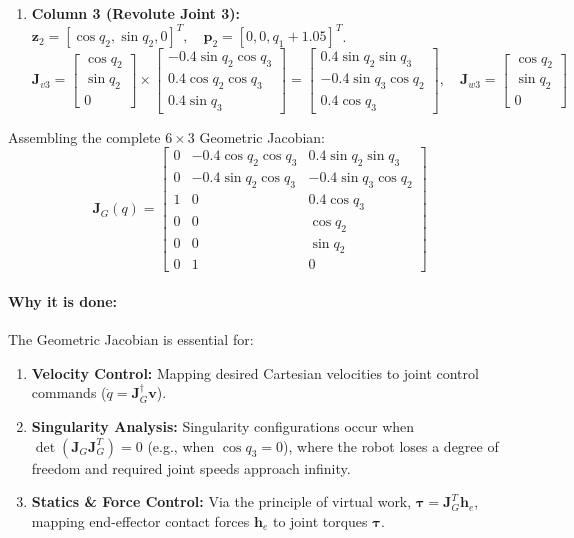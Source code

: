 \documentclass[11pt, a4paper]{article}
\begin{document}
\begin{enumerate}[leftmargin=1.5em]
    \item \textbf{Column 3 (Revolute Joint 3):}
    $\mathbf{z}_2 = [\cos q_2, \sin q_2, 0]^T, \quad \mathbf{p}_2 = [0, 0, q_1 + 1.05]^T$.
    \begin{equation}
        \mathbf{J}_{v3} = \begin{bmatrix} \cos q_2 \\ \sin q_2 \\ 0 \end{bmatrix} \times \begin{bmatrix} -0.4 \sin q_2 \cos q_3 \\ 0.4 \cos q_2 \cos q_3 \\ 0.4 \sin q_3 \end{bmatrix} = \begin{bmatrix} 0.4 \sin q_2 \sin q_3 \\ -0.4 \sin q_3 \cos q_2 \\ 0.4 \cos q_3 \end{bmatrix}, \quad \mathbf{J}_{w3} = \begin{bmatrix} \cos q_2 \\ \sin q_2 \\ 0 \end{bmatrix}
    \end{equation}
\end{enumerate}

Assembling the complete $6 \times 3$ Geometric Jacobian:
\begin{equation}
\mathbf{J}_G(q) = \begin{bmatrix}
0 & -0.4 \cos q_2 \cos q_3 & 0.4 \sin q_2 \sin q_3 \\
0 & -0.4 \sin q_2 \cos q_3 & -0.4 \sin q_3 \cos q_2 \\
1 & 0 & 0.4 \cos q_3 \\
0 & 0 & \cos q_2 \\
0 & 0 & \sin q_2 \\
0 & 1 & 0
\end{bmatrix}
\end{equation}

\paragraph{Why it is done:}
The Geometric Jacobian is essential for:
\begin{enumerate}[leftmargin=1.5em]
    \item \textbf{Velocity Control:} Mapping desired Cartesian velocities to joint control commands ($\dot{q} = \mathbf{J}_G^\dagger \mathbf{v}$).
    \item \textbf{Singularity Analysis:} Singularity configurations occur when $\det(\mathbf{J}_G \mathbf{J}_G^T) = 0$ (e.g., when $\cos q_3 = 0$), where the robot loses a degree of freedom and required joint speeds approach infinity.
    \item \textbf{Statics \& Force Control:} Via the principle of virtual work, $\boldsymbol{\tau} = \mathbf{J}_G^T \mathbf{h}_e$, mapping end-effector contact forces $\mathbf{h}_e$ to joint torques $\boldsymbol{\tau}$.
\end{enumerate}
\end{document}
